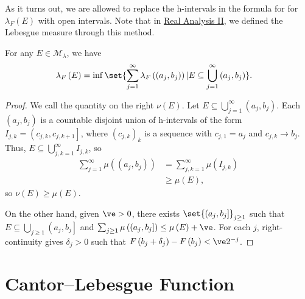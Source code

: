 \documentclass[10pt]{mypackage}
\begin{document}
As it turns out, we are allowed to replace the h-intervals in the formula for for $\lambda_F(E)$ with open intervals. Note that in \href{https://ai.avinash-iyer.com/Classes_and_Homework/College/Y3/Y3S2,\%20Real\%20II/real_2_notes.pdf}{Real Analysis II}, we defined the Lebesgue measure through this method.
\begin{lemma}
  For any $E\in \mathcal{M}_{\lambda}$, we have
  \begin{align*}
    \lambda_F\left( E \right) &= \inf\set{\sum_{j=1}^{\infty}\lambda_F\left( \left( a_j,b_j \right) \right) | E\subseteq \bigcup_{j=1}^{\infty}\left( a_j,b_j \right)}.
  \end{align*}
\end{lemma}
\begin{proof}
  We call the quantity on the right $\nu\left( E \right)$. Let $E\subseteq \bigcup_{j=1}^{\infty}\left( a_j,b_j \right)$. Each $\left( a_j,b_j \right)$ is a countable disjoint union of h-intervals of the form $I_{j,k} = \left( c_{j,k},c_{j,k+1} \right]$, where $\left( c_{j,k} \right)_k$ is a sequence with $c_{j,1} = a_j$ and $c_{j,k}\rightarrow b_j$. Thus, $E\subseteq \bigcup_{j,k=1}^{\infty}I_{j,k}$, so
  \begin{align*}
    \sum_{j=1}^{\infty}\mu\left( \left( a_j,b_j \right) \right) &= \sum_{j,k=1}^{\infty}\mu\left( I_{j,k} \right)\\
                                                                &\geq \mu\left( E \right),
  \end{align*}
  so $\nu\left( E \right)\geq \mu\left( E \right)$.\newline

  On the other hand, given $\ve > 0$, there exists $\set{\left( a_j,b_j \right]}_{j\geq 1}$ such that $E\subseteq \bigcup_{j\geq 1}\left( a_j,b_j \right]$ and $\sum_{j\geq 1}\mu\left( \left( a_j,b_j \right] \right) \leq \mu\left( E \right) + \ve$. For each $j$, right-continuity gives $\delta_j > 0$ such that $F\left( b_j + \delta_j \right) - F\left( b_j \right) < \ve 2^{-j}$.
\end{proof}

\section{Cantor--Lebesgue Function}%
\end{document}
